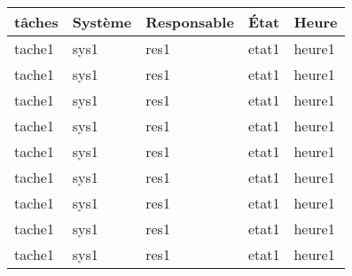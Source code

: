 \Large\begin{tabularx}{\linewidth}{
    |>{\hsize=3.0\hsize}X|%
    >{\hsize=0.5\hsize}X|%
    >{\hsize=0.5\hsize}X|%
    >{\hsize=0.5\hsize}X|%
    >{\hsize=0.5\hsize}X|%
  }
    \hline
    tâches & Système & Responsable & État & Heure\\\hline
    tache1 & sys1 & res1 & etat1 & heure1\\\hline
    tache1 & sys1 & res1 & etat1 & heure1\\\hline
    tache1 & sys1 & res1 & etat1 & heure1\\\hline
    tache1 & sys1 & res1 & etat1 & heure1\\\hline
    tache1 & sys1 & res1 & etat1 & heure1\\\hline
    tache1 & sys1 & res1 & etat1 & heure1\\\hline
    tache1 & sys1 & res1 & etat1 & heure1\\\hline
    tache1 & sys1 & res1 & etat1 & heure1\\\hline
    tache1 & sys1 & res1 & etat1 & heure1\\\hline
  \end{tabularx}
     